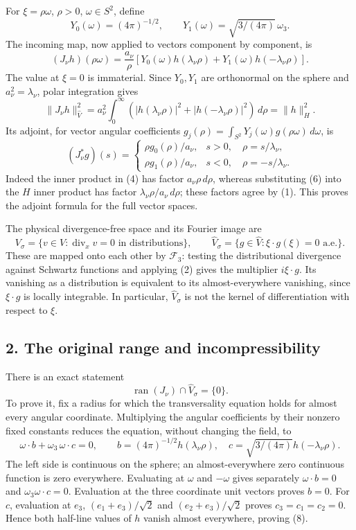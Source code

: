 For \(\xi=\rho\omega\), \(\rho>0\), \(\omega\in S^2\), define \[
Y_0(\omega)=(4\pi)^{-1/2},\qquad
Y_1(\omega)=\sqrt{3/(4\pi)}\,\omega_3.
\tag{3}
\] The incoming map, now applied to vectors component by component, is \[
(J_\nu h)(\rho\omega)=\frac{a_\nu}{\rho}
\left[Y_0(\omega)h(\lambda_\nu\rho)
      +Y_1(\omega)h(-\lambda_\nu\rho)\right].
\tag{4}
\] The value at \(\xi=0\) is immaterial. Since \(Y_0,Y_1\) are orthonormal on the sphere and \(a_\nu^2=\lambda_\nu\), polar integration gives \[
\|J_\nu h\|_{\widehat V}^2
=a_\nu^2\int_0^\infty
 (|h(\lambda_\nu\rho)|^2+|h(-\lambda_\nu\rho)|^2)\,d\rho
=\|h\|_H^2.
\tag{5}
\] Its adjoint, for vector angular coefficients \(g_j(\rho)=\int_{S^2}Y_j(\omega)g(\rho\omega)\,d\omega\), is \[
(J_\nu^*g)(s)=
\begin{cases}
\rho g_0(\rho)/a_\nu,&s>0,\quad\rho=s/\lambda_\nu,\\
\rho g_1(\rho)/a_\nu,&s<0,\quad\rho=-s/\lambda_\nu.
\end{cases}
\tag{6}
\] Indeed the inner product in (4) has factor \(a_\nu\rho\,d\rho\), whereas substituting (6) into the \(H\) inner product has factor \(\lambda_\nu\rho/a_\nu\,d\rho\); these factors agree by (1). This proves the adjoint formula for the full vector spaces.

The physical divergence-free space and its Fourier image are \[
V_\sigma=\{v\in V:\operatorname{div}_xv=0\text{ in distributions}\},
\qquad
\widehat V_\sigma=\{g\in\widehat V:\xi\cdot g(\xi)=0\text{ a.e.}\}.
\tag{7}
\] These are mapped onto each other by \(\mathcal F_3\): testing the distributional divergence against Schwartz functions and applying (2) gives the multiplier \(i\xi\cdot g\). Its vanishing as a distribution is equivalent to its almost-everywhere vanishing, since \(\xi\cdot g\) is locally integrable. In particular, \(\widehat V_\sigma\) is not the kernel of differentiation with respect to \(\xi\).

\subsection{2. The original range and incompressibility}\label{the-original-range-and-incompressibility}

There is an exact statement \[
\operatorname{ran}(J_\nu)\cap\widehat V_\sigma=\{0\}.
\tag{8}
\] To prove it, fix a radius for which the transversality equation holds for almost every angular coordinate. Multiplying the angular coefficients by their nonzero fixed constants reduces the equation, without changing the field, to \[
\omega\cdot b+\omega_3\,\omega\cdot c=0,
\qquad
b=(4\pi)^{-1/2}h(\lambda_\nu\rho),\quad
c=\sqrt{3/(4\pi)}h(-\lambda_\nu\rho).
\tag{9}
\] The left side is continuous on the sphere; an almost-everywhere zero continuous function is zero everywhere. Evaluating at \(\omega\) and \(-\omega\) gives separately \(\omega\cdot b=0\) and \(\omega_3\omega\cdot c=0\). Evaluation at the three coordinate unit vectors proves \(b=0\). For \(c\), evaluation at \(e_3\), \((e_1+e_3)/\sqrt2\) and \((e_2+e_3)/\sqrt2\) proves \(c_3=c_1=c_2=0\). Hence both half-line values of \(h\) vanish almost everywhere, proving (8).

